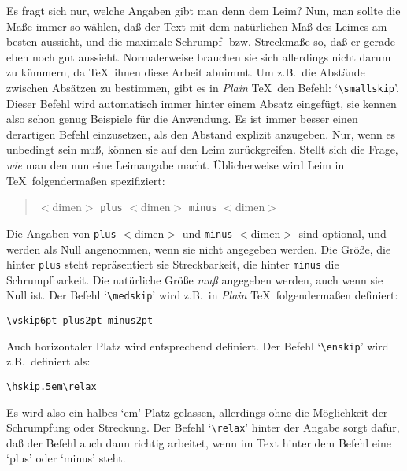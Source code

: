 Es fragt sich nur, welche Angaben gibt man denn dem Leim? Nun, man
sollte die Ma\ss{}e immer so w\"ahlen, da\ss{} der Text mit dem nat\"urlichen Ma\ss{}
des Leimes am besten aussieht, und die maximale
Schrumpf- bzw.
Streckma\ss{}e so, da\ss{} er gerade eben noch gut aussieht. Normalerweise
brauchen sie sich allerdings nicht darum zu k\"ummern, da \TeX\ ihnen
diese Arbeit abnimmt. Um z.B.\ die Abst\"ande zwischen Abs\"atzen zu
bestimmen, gibt es in {\em Plain} \TeX\ den Befehl:
`\verb|\smallskip|'.
Dieser Befehl wird automatisch immer hinter einem 
Absatz eingef\"ugt,
sie kennen also schon genug Beispiele f\"ur die Anwendung. Es ist immer
besser einen derartigen Befehl einzusetzen, als den 
Abstand explizit
anzugeben. Nur, wenn es unbedingt sein mu\ss{}, k\"onnen sie auf den Leim
zur\"uckgreifen. Stellt sich die Frage, {\em wie} man den nun eine
Leimangabe macht. \"Ublicherweise wird Leim in \TeX\ folgenderma\ss{}en
spezifiziert:
\begin{quote}
$<$dimen$>$ {\tt plus} $<$dimen$>$ {\tt minus} $<$dimen$>$
\end{quote}
Die Angaben von {\tt plus} $<$dimen$>$ und {\tt minus} $<$dimen$>$
sind optional, und werden als Null angenommen, wenn sie nicht
angegeben werden. Die 
Gr\"o\ss{}e, die hinter {\tt plus} steht repr\"asentiert
sie Streckbarkeit, die hinter {\tt minus} die
Schrumpfbarkeit. Die
nat\"urliche Gr\"o\ss{}e {\em mu\ss{}} angegeben werden, auch wenn sie Null ist.
Der Befehl 
`\verb|\medskip|' wird z.B.\ in {\em Plain} \TeX\ folgenderma\ss{}en
definiert:
\begin{verbatim}
\vskip6pt plus2pt minus2pt
\end{verbatim}
Auch horizontaler Platz wird entsprechend definiert. Der Befehl
`\verb|\enskip|' wird z.B.\ definiert als:
\begin{verbatim}
\hskip.5em\relax
\end{verbatim}
Es wird also ein halbes `em' Platz gelassen, allerdings ohne die
M\"oglichkeit der Schrumpfung oder Streckung. Der Befehl
`\verb|\relax|'
hinter der Angabe sorgt daf\"ur, da\ss{} der Befehl auch dann richtig
arbeitet, wenn im Text hinter dem Befehl eine `plus' oder `minus'
steht.


